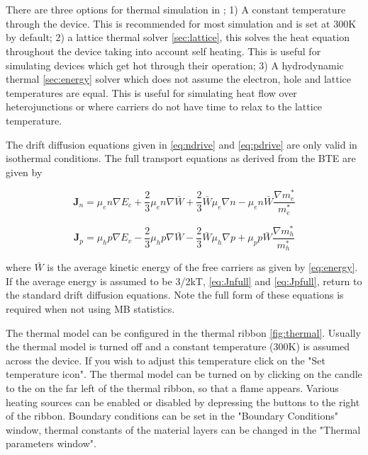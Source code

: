 \section{}
There are three options for thermal simulation in \simname; 1) A constant temperature through the device. This is recommended for most simulation and is set at 300K by default; 2) a lattice thermal solver \ref{sec:lattice}, this solves the heat equation throughout the device taking into account self heating.  This is useful for simulating devices which get hot through their operation; 3) A hydrodynamic thermal \ref{sec:energy} solver which does not assume the electron, hole and lattice temperatures are equal.  This is useful for simulating heat flow over heterojunctions or where carriers do not have time to relax to the lattice temperature.

The drift diffusion equations given in \ref{eq:ndrive} and \ref{eq:pdrive} are only valid in isothermal conditions.  The full transport equations as derived from the BTE \cite{Azoff} are given by

\begin{equation}
\label{eq:Jnfull}
 \textbf{J}_n = \mu_e n \nabla E_c +\frac{2}{3} \mu_e n \nabla \bar{W} + \frac{2}{3} \bar{W} \mu_e \nabla n - \mu_e n \bar{W} \frac{\nabla m^*_e}{m^*_e}
\end{equation}


\begin{equation}
\label{eq:Jpfull}
 \textbf{J}_p = \mu_h p \nabla E_v -\frac{2}{3} \mu_h p \nabla \bar{W} - \frac{2}{3} \bar{W} \mu_h \nabla p + \mu_p p \bar{W} \frac{\nabla m^*_h}{m^*_h}
\end{equation}

where $\bar{W}$ is the average kinetic energy of the free carriers as given by \ref{eq:energy}.  If the average energy is assumed to be 3/2kT, \ref{eq:Jnfull} and \ref{eq:Jpfull}, return to the standard drift diffusion equations. Note the full form of these equations is required when not using MB statistics.

The thermal model can be configured in the thermal ribbon \ref{fig:thermal}. Usually the thermal model is turned off and a constant temperature (300K) is assumed across the device. If you wish to adjust this temperature click on the "Set temperature icon".  The thermal model can be turned on by clicking on the candle to the on the far left of the thermal ribbon, so that a flame appears.  Various heating sources can be enabled or disabled by depressing the buttons to the right of the ribbon. Boundary conditions can be set in the "Boundary Conditions" window, thermal constants of the material layers can be changed in the "Thermal parameters window".

